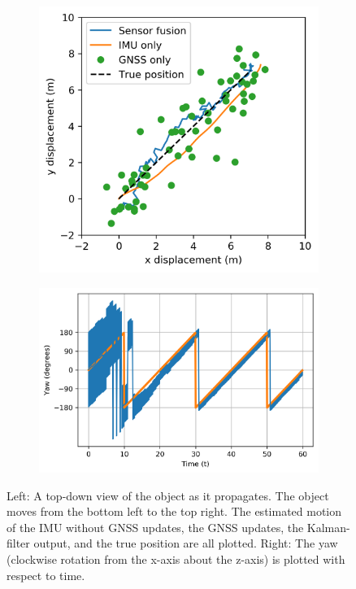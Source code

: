 \documentclass[10pt]{article}
\begin{document}
\begin{figure}
  \centering
  \begin{subfigure}[b]{.35\textwidth}
    \includegraphics[width=\textwidth]{../images/position-with-initial-estimate-right.png}
  \end{subfigure}
  \begin{subfigure}[b]{.5\textwidth}
    \includegraphics[width=\textwidth]{../images/yaw-with-large-initial-estimate-right.png}
  \end{subfigure}
  \caption{\label{ref:2d-correct-initial} Left: A top-down view of the object as it propagates. The object moves from the bottom left to the top right. The estimated motion of the IMU without GNSS updates, the GNSS updates, the Kalman-filter output, and the true position are all plotted. Right: The yaw (clockwise rotation from the x-axis about the z-axis) is plotted with respect to time.}
\end{figure}
\end{document}
